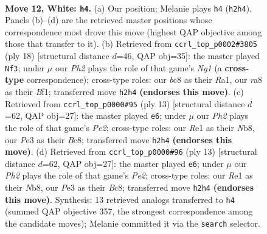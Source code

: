\documentclass[11pt]{article}
\begin{document}
\begin{figure}[p]\centering
\begin{subfigure}{0.46\textwidth}\centering
\resizebox{\linewidth}{!}{%
\newchessgame
\chessboard[
  setfen={r1bqr1k1/1pp1bp1p/2n1p1p1/p2n4/2NP4/4PBP1/PP3P1P/RNBQR1K1 w - - 0 12},
  showmover=false,
  pgfstyle=straightmove, color=movearrow, markmove={h2-h4}
]}
\caption{}
\end{subfigure}\hfill
\begin{subfigure}{0.46\textwidth}\centering
\resizebox{\linewidth}{!}{%
\newchessgame
\chessboard[
  setfen={r1bqkb1r/pp3ppp/1nn1p3/3pP3/P2P1P2/2N5/1P4PP/R1BQKBNR w KQkq - 0 10},
  showmover=false,
  pgfstyle=straightmove, color=movearrow, markmove={g1-f3}
]}
\caption{}
\end{subfigure}
\\[4pt]
\begin{subfigure}{0.46\textwidth}\centering
\resizebox{\linewidth}{!}{%
\newchessgame
\chessboard[
  setfen={rnb1kb1r/1p2pppp/pq1p1n2/8/4P3/1NN2P2/PPP3PP/R1BQKB1R b KQkq - 2 7},
  showmover=false,
  pgfstyle=straightmove, color=movearrow, markmove={e7-e6}
]}
\caption{}
\end{subfigure}\hfill
\begin{subfigure}{0.46\textwidth}\centering
\resizebox{\linewidth}{!}{%
\newchessgame
\chessboard[
  setfen={rnb1kb1r/1p2pppp/pq1p1n2/8/4P3/1NN2P2/PPP3PP/R1BQKB1R b KQkq - 2 7},
  showmover=false,
  pgfstyle=straightmove, color=movearrow, markmove={e7-e6}
]}
\caption{}
\end{subfigure}
\caption{\textbf{Move 12, White: \texttt{h4}.} (a) Our position; Melanie plays \texttt{h4} (\texttt{h2h4}). Panels (b)--(d) are the retrieved master positions whose correspondence most drove this move (highest QAP objective among those that transfer to it). (b) Retrieved from \texttt{ccrl\_top\_p0002\#3805} (ply 18) [structural distance $d$=46, QAP obj=35]: the master played \texttt{Nf3}; under $\mu$ our \emph{Ph2} plays the role of that game's \emph{Ng1} (a \textbf{cross-type} correspondence); cross-type roles: our \emph{b}c8 as their \emph{R}a1, our \emph{r}a8 as their \emph{B}f1; transferred move \texttt{h2h4} \textbf{(endorses this move)}. (c) Retrieved from \texttt{ccrl\_top\_p0000\#95} (ply 13) [structural distance $d$=62, QAP obj=27]: the master played \texttt{e6}; under $\mu$ our \emph{Ph2} plays the role of that game's \emph{Pe2}; cross-type roles: our \emph{R}e1 as their \emph{N}b8, our \emph{P}e3 as their \emph{B}c8; transferred move \texttt{h2h4} \textbf{(endorses this move)}. (d) Retrieved from \texttt{ccrl\_top\_p0000\#96} (ply 13) [structural distance $d$=62, QAP obj=27]: the master played \texttt{e6}; under $\mu$ our \emph{Ph2} plays the role of that game's \emph{Pe2}; cross-type roles: our \emph{R}e1 as their \emph{N}b8, our \emph{P}e3 as their \emph{B}c8; transferred move \texttt{h2h4} \textbf{(endorses this move)}. Synthesis: 13 retrieved analogs transferred to \texttt{h4} (summed QAP objective 357, the strongest correspondence among the candidate moves); Melanie committed it via the \texttt{search} selector.}
\label{fig:thought-m22}
\end{figure}
\end{document}
